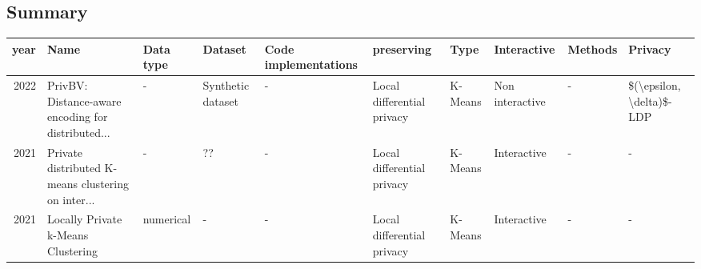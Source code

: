 \subsection{Summary}
\begin{landscape}
  \begin{table}[ht]
    \centering
    \begin{adjustbox}{width=1.8\textwidth}
      \begin{tabular}{rlllllllll}
        \toprule
        year              & Name                                                                                                          & Data type                            & Dataset                                            & Code implementations                    & preserving                 & Type                & Interactive     & Methods                                   & Privacy                                                                                                       \\
        \midrule
        2022              & PrivBV: Distance-aware encoding for distributed...                                                            & -                                    & Synthetic dataset                                  & -                                       & Local differential privacy & K-Means             & Non interactive & -                                         & \$(\textbackslash epsilon, \textbackslash delta)\$-LDP                                                        \\
        2021              & Private distributed K-means clustering on inter...                                                            & -                                    & ??                                                 & -                                       & Local differential privacy & K-Means             & Interactive     & -                                         & -                                                                                                             \\
        2021              & Locally Private k-Means Clustering                                                                            & numerical                            & -                                                  & -                                       & Local differential privacy & K-Means             & Interactive     & -                                         & -                                                                                                             \\

\end{tabular}
\end{adjustbox}
\end{table}
\end{landscape}
